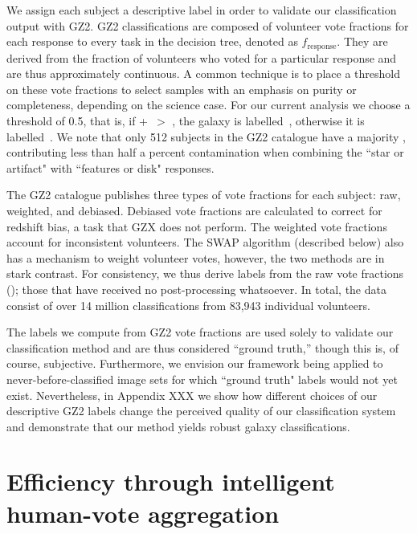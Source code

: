 We assign each subject a descriptive label in order to validate our classification output with GZ2. GZ2 classifications are composed of volunteer vote fractions for each response to every task in the decision tree, denoted as $f_{\mathrm{response}}$. They are derived from the fraction of volunteers who voted for a particular response and are thus approximately continuous. A common technique is to place a threshold on these vote fractions to select samples with an emphasis on purity or completeness, depending on the science case. For our current analysis we choose a threshold of 0.5, that is, if \ffeat+\fstar~$ >$ \fsmooth, the galaxy is labelled~\feat, otherwise it is labelled~\notfeat. We note that only 512 subjects in the GZ2 catalogue have a majority \fstar, contributing less than half a percent contamination when combining the ``star or artifact" with ``features or disk" responses.

The GZ2 catalogue publishes three types of vote fractions for each subject: raw, weighted, and debiased. Debiased vote fractions are calculated to correct for redshift bias, a task that GZX does not perform. The weighted vote fractions account for inconsistent volunteers. The SWAP algorithm (described below) also has a mechanism to weight volunteer votes, however, the two methods are in stark contrast. For consistency, we thus derive labels from the raw vote fractions (\raw); those that have received no post-processing whatsoever. In total, the data consist of over 14 million classifications from 83,943 individual volunteers. 

The labels we compute from GZ2 vote fractions are used solely to validate our classification method and are thus considered ``ground truth,'' though this is, of course, subjective. Furthermore, we envision our framework being applied to never-before-classified image sets for which ``ground truth" labels would not yet exist. Nevertheless, in Appendix XXX we show how different choices of our descriptive GZ2 labels change the perceived quality of our classification system and demonstrate that our method yields robust galaxy classifications.


\section{Efficiency through intelligent human-vote aggregation}\label{sec: SWAP}

